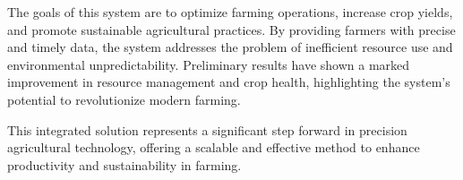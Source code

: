 \documentclass[12pt, a4paper]{article}
\begin{document}
The goals of this system are to optimize farming operations, increase crop yields, and promote sustainable agricultural practices. By providing farmers with precise and timely data, the system addresses the problem of inefficient resource use and environmental unpredictability. Preliminary results have shown a marked improvement in resource management and crop health, highlighting the system's potential to revolutionize modern farming.

This integrated solution represents a significant step forward in precision agricultural technology, offering a scalable and effective method to enhance productivity and sustainability in farming.
\end{document}
